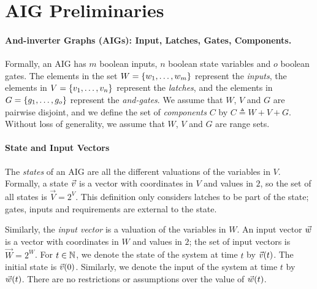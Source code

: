 \section{AIG Preliminaries}
\paragraph{And-inverter Graphs (AIGs): Input, Latches, Gates, Components.}
Formally, an AIG has $m$ boolean 
inputs, $n$ boolean state variables and $o$ boolean gates. The elements in the set 
$W=\left\{w_1, \ldots, w_m\right\}$ represent the \emph{inputs}, the elements in 
$V=\left\{v_1, \ldots, v_n\right\}$ represent the \emph{latches}, and the elements in 
$G=\left\{g_1, \ldots, g_o\right\}$ represent the \emph{and-gates}. We assume that $W$, $V$ and $G$ are pairwise disjoint, and we define the set of \emph{components} $C$ by $C\triangleq W + V + G$. Without loss of generality, we assume that $W$, $V$ and $G$ are range sets.



\paragraph{State and Input Vectors}
\label{sec:Preliminaries:AIGStates}
The \emph{states} of an AIG are all the different valuations of the variables in $V$.
Formally, a state $\vec{v}$ is a vector with coordinates in $V$ and values in $2$, so the set of all states is $\vec{V}=2^V$. This definition only considers latches to be part of the state; gates, inputs and requirements are external to the state.

Similarly, the \emph{input vector} is a
valuation of the variables in $W$. An input vector $\vec{w}$ is a vector with coordinates in $W$ and values in $2$; the set of input vectors is $\vec{W}=2^W$. 
For  $t\in \mathbb{N}$, we denote the state of the system at time $t$ by $\vec{v}(t)$.
The initial state is $\vec{v}(0)$. %
Similarly, we denote the input of the system at time $t$ by $\vec{w}(t)$. %
There are no restrictions or assumptions over the value of $\vec{w}(t)$.%

